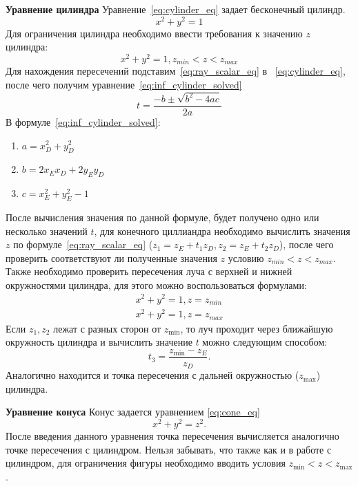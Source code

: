\textbf{Уравнение цилиндра}
Уравнение~\ref{eq:cylinder_eq} задает бесконечный цилиндр.
\begin{equation}
	x^2 + y^2=1
	\label{eq:cylinder_eq}
\end{equation}
Для ограничения цилиндра необходимо ввести требования к значению $z$ цилиндра:
\begin{equation}
	x^2 + y^2=1,z_{min} < z  < z_{max}	
	\label{eq:cylinder_eq_demanding}
\end{equation}
Для нахождения пересечений подставим~\ref{eq:ray_scalar_eq} в ~\ref{eq:cylinder_eq}, после чего получим уравнение~\ref{eq:inf_cylinder_solved}
\begin{equation}
	t=\frac{-b\pm\sqrt{b^2-4ac}}{2a}
	\label{eq:inf_cylinder_solved}
\end{equation}
В формуле~\ref{eq:inf_cylinder_solved}:
\begin{enumerate}
	\item $a = x_{D}^2 + y_{D}^2$ 
	\item $b = 2x_Ex_D+2y_Ey_D$ 
	\item $c = x_{E}^2+y_{E}^2 - 1$
\end{enumerate}

После вычисления значения по данной формуле, будет получено  одно или несколько значений $t$, для конечного циллиандра необходимо вычислить значения $z$ по
формуле~\ref{eq:ray_scalar_eq} ($z_1 = z_E + t_1z_D,z_2 = z_E + t_2z_D$), после чего проверить соответствуют ли полученные значения $z$ условию $z_{min} < z  < z_{max}$.
Также необходимо проверить пересечения луча с верхней и нижней окружностями цилиндра, для этого можно воспользоваться формулами:
\begin{equation}
	\label{eq:cylinder_caps}
	\begin{aligned}
		x^2 + y^2=1,z = z_{min}\\
		x^2 + y^2=1,z = z_{max}
	\end{aligned}
\end{equation}
Если $z_1,z_2$ лежат с разных сторон от $z_{\min}$, то луч проходит через ближайшую окружность цилиндра и вычислить значение $t$ можно следующим способом:
\begin{equation}
	t_3=\frac{z_{\min}-z_E}{z_D}.
	\label{eq:cylinder_caps_solved}
\end{equation}
Аналогично находится и точка пересечения с дальней окружностью ($z_{\max}$) цилиндра.\cite{primitives_raytracing_equations}


\textbf{Уравнение конуса}
Конус задается уравнением \ref{eq:cone_eq}
\begin{equation}
	x^2+y^2=z^2.
	\label{eq:cone_eq}
\end{equation}
После введения данного уравнения точка пересечения вычисляется аналогично точке пересечения с цилиндром. Нельзя забывать, что также как и в работе с цилиндром, для
ограничения фигуры необходимо вводить условия $z_{\min} < z < z_{\max}$.

